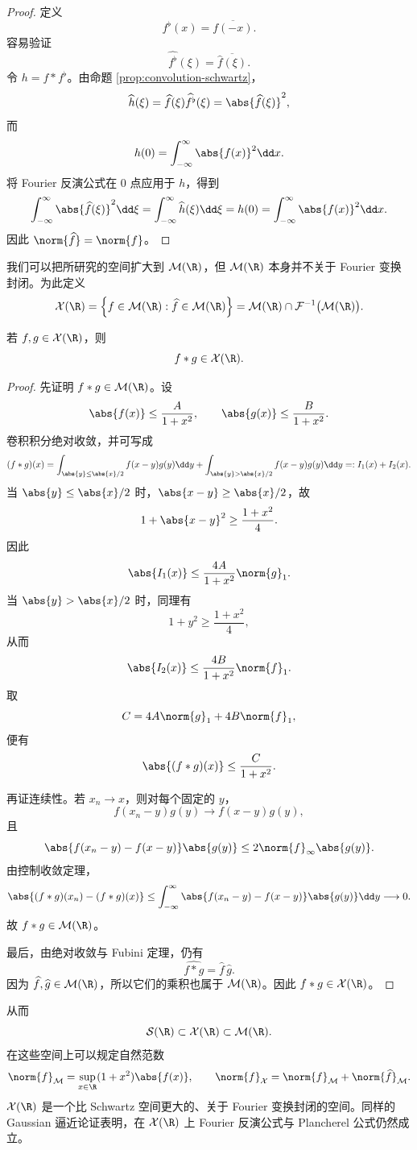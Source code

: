 \begin{proof}
	定义
	\[
	f^{\flat}(x)=\overline{f(-x)}.
	\]
	容易验证
	\[
	\widehat{f^{\flat}}(\xi)=\overline{\widehat f(\xi)}.
	\]
	令 $h=f*f^{\flat}$。由命题 \ref{prop:convolution-schwartz}，
	\[
	\widehat h(\xi)
	=\widehat f(\xi)\widehat{f^{\flat}}(\xi)
	=\abs{\widehat f(\xi)}^2,
	\]
	而
	\[
	h(0)=\int_{-\infty}^{\infty}\abs{f(x)}^2\dd x.
	\]
	将 Fourier 反演公式在 $0$ 点应用于 $h$，得到
	\[
	\int_{-\infty}^{\infty}\abs{\widehat f(\xi)}^2\dd\xi
	=\int_{-\infty}^{\infty}\widehat h(\xi)\dd\xi
	=h(0)
	=\int_{-\infty}^{\infty}\abs{f(x)}^2\dd x.
	\]
	因此 $\norm{\widehat f}=\norm{f}$。
\end{proof}

我们可以把所研究的空间扩大到 $\mathcal M(\R)$，但 $\mathcal M(\R)$ 本身并不关于 Fourier 变换封闭。为此定义
\[
\mathcal X(\R)
=\left\{f\in\mathcal M(\R):\widehat f\in\mathcal M(\R)\right\}
=\mathcal M(\R)\cap\mathcal F^{-1}\bigl(\mathcal M(\R)\bigr).
\]

\begin{proposition}\label{prop:convolution-X}
	若 $f,g\in\mathcal X(\R)$，则
	\[
	f*g\in\mathcal X(\R).
	\]
\end{proposition}

\begin{proof}
	先证明 $f*g\in\mathcal M(\R)$。设
	\[
	\abs{f(x)}\leq\frac{A}{1+x^2},
	\qquad
	\abs{g(x)}\leq\frac{B}{1+x^2}.
	\]
	卷积积分绝对收敛，并可写成
	\[
	(f*g)(x)
	=\int_{\abs{y}\leq\abs{x}/2}f(x-y)g(y)\dd y
	+\int_{\abs{y}>\abs{x}/2}f(x-y)g(y)\dd y
	=:I_1(x)+I_2(x).
	\]
	当 $\abs{y}\leq\abs{x}/2$ 时，$\abs{x-y}\geq\abs{x}/2$，故
	\[
	1+\abs{x-y}^2\geq\frac{1+x^2}{4}.
	\]
	因此
	\[
	\abs{I_1(x)}
	\leq\frac{4A}{1+x^2}\norm{g}_1.
	\]
	当 $\abs{y}>\abs{x}/2$ 时，同理有
	\[
	1+y^2\geq\frac{1+x^2}{4},
	\]
	从而
	\[
	\abs{I_2(x)}
	\leq\frac{4B}{1+x^2}\norm{f}_1.
	\]
	取
	\[
	C=4A\norm{g}_1+4B\norm{f}_1,
	\]
	便有
	\[
	\abs{(f*g)(x)}\leq\frac{C}{1+x^2}.
	\]
	
	再证连续性。若 $x_n\to x$，则对每个固定的 $y$，
	\[
	f(x_n-y)g(y)\longrightarrow f(x-y)g(y),
	\]
	且
	\[
	\abs{f(x_n-y)-f(x-y)}\abs{g(y)}
	\leq2\norm{f}_\infty\abs{g(y)}.
	\]
	由控制收敛定理，
	\[
	\abs{(f*g)(x_n)-(f*g)(x)}
	\leq\int_{-\infty}^{\infty}
	\abs{f(x_n-y)-f(x-y)}\abs{g(y)}\dd y
	\longrightarrow0.
	\]
	故 $f*g\in\mathcal M(\R)$。
	
	最后，由绝对收敛与 Fubini 定理，仍有
	\[
	\widehat{f*g}=\widehat f\,\widehat g.
	\]
	因为 $\widehat f,\widehat g\in\mathcal M(\R)$，所以它们的乘积也属于 $\mathcal M(\R)$。因此 $f*g\in\mathcal X(\R)$。
\end{proof}

从而
\[
\mathcal S(\R)\subset\mathcal X(\R)\subset\mathcal M(\R).
\]
在这些空间上可以规定自然范数
\[
\norm{f}_{\mathcal M}
=\sup_{x\in\R}(1+x^2)\abs{f(x)},
\qquad
\norm{f}_{\mathcal X}
=\norm{f}_{\mathcal M}+\norm{\widehat f}_{\mathcal M}.
\]
$\mathcal X(\R)$ 是一个比 Schwartz 空间更大的、关于 Fourier 变换封闭的空间。同样的 Gaussian 逼近论证表明，在 $\mathcal X(\R)$ 上 Fourier 反演公式与 Plancherel 公式仍然成立。
